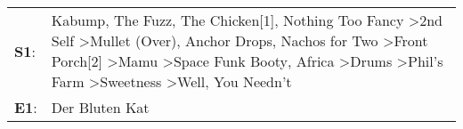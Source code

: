 \begin{supertabular}{p{0.03\textwidth}p{0.92\textwidth}}
 \textbf{S1}:  &  Kabump\textsuperscript{}, \enspace The Fuzz\textsuperscript{}, \enspace The Chicken[1]\textsuperscript{}, \enspace Nothing Too Fancy\textsuperscript{} \textgreater \enspace 2nd Self\textsuperscript{} \textgreater \enspace Mullet (Over)\textsuperscript{}, \enspace Anchor Drops\textsuperscript{}, \enspace Nachos for Two\textsuperscript{} \textgreater \enspace Front Porch[2]\textsuperscript{} \textgreater \enspace Mamu\textsuperscript{} \textgreater \enspace Space Funk Booty\textsuperscript{}, \enspace Africa\textsuperscript{} \textgreater \enspace Drums\textsuperscript{} \textgreater \enspace Phil's Farm\textsuperscript{} \textgreater \enspace Sweetness\textsuperscript{} \textgreater \enspace Well, You Needn't\textsuperscript{}  \enspace  \\
 \textbf{E1}:  &                                                                                                                                                                                                                                                                                                                                                                                                                                                                                                                                                                                                                                                                                                                                 Der Bluten Kat\textsuperscript{}  \enspace  \\
\end{supertabular}

